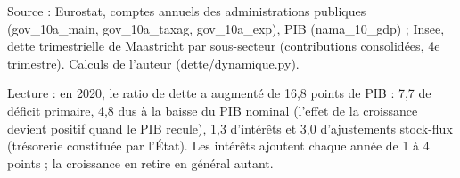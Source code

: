 Source : Eurostat, comptes annuels des administrations publiques (gov\_10a\_main, gov\_10a\_taxag, gov\_10a\_exp), PIB (nama\_10\_gdp) ; Insee, dette trimestrielle de Maastricht par sous-secteur (contributions consolidées, 4e trimestre). Calculs de l'auteur (dette/dynamique.py).\par Lecture : en 2020, le ratio de dette a augmenté de 16,8 points de PIB : 7,7 de déficit primaire, 4,8 dus à la baisse du PIB nominal (l'effet de la croissance devient positif quand le PIB recule), 1,3 d'intérêts et 3,0 d'ajustements stock-flux (trésorerie constituée par l'État). Les intérêts ajoutent chaque année de 1 à 4 points ; la croissance en retire en général autant.

